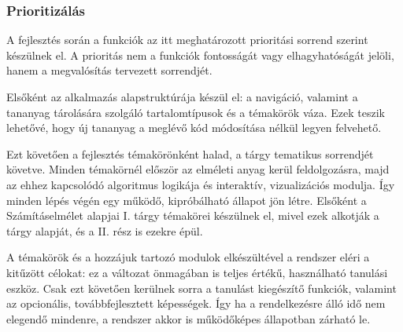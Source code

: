 \clearpage
\subsubsection{Prioritizálás}
A fejlesztés során a funkciók az itt meghatározott prioritási sorrend
szerint készülnek el. A prioritás nem a funkciók fontosságát vagy
elhagyhatóságát jelöli, hanem a megvalósítás tervezett sorrendjét.

Elsőként az alkalmazás alapstruktúrája készül el: a navigáció, valamint
a tananyag tárolására szolgáló tartalomtípusok és a témakörök váza.
Ezek teszik lehetővé, hogy új tananyag a meglévő kód módosítása nélkül
legyen felvehető.

Ezt követően a fejlesztés témakörönként halad, a tárgy tematikus
sorrendjét követve. Minden témakörnél először az elméleti anyag kerül
feldolgozásra, majd az ehhez kapcsolódó algoritmus logikája és
interaktív, vizualizációs modulja. Így minden lépés végén egy működő,
kipróbálható állapot jön létre. Elsőként a Számításelmélet alapjai I.
tárgy témakörei készülnek el, mivel ezek alkotják a tárgy alapját,
és a II. rész is ezekre épül.

A témakörök és a hozzájuk tartozó modulok elkészültével a rendszer
eléri a kitűzött célokat: ez a változat önmagában is teljes értékű,
használható tanulási eszköz. Csak ezt követően kerülnek sorra a
tanulást kiegészítő funkciók, valamint az opcionális, továbbfejlesztett
képességek. Így ha a rendelkezésre álló idő nem elegendő mindenre,
a rendszer akkor is működőképes állapotban zárható le.

